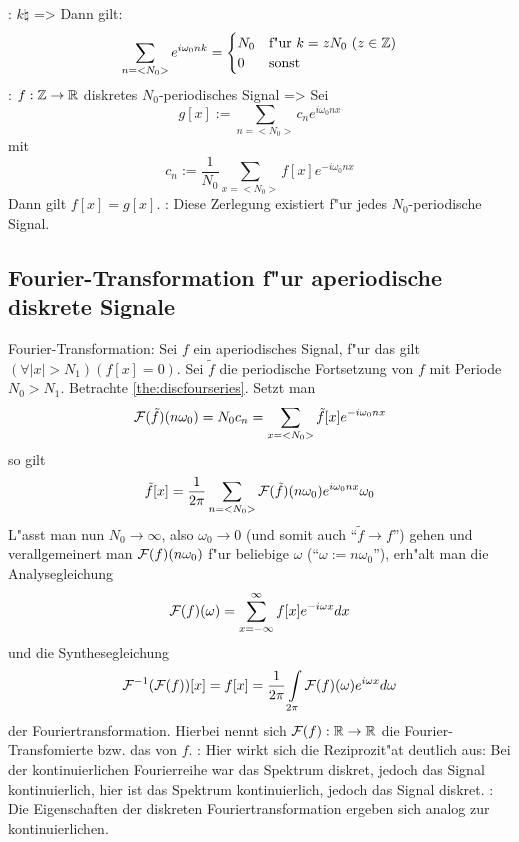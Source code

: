 \theorem:
  $k\natural$
  =>
{
  Dann gilt:
  \[
    \sum_{n=<N_0>} e^{i\omega_0 nk} =
    \begin{cases}
      N_0 & \text{f"ur $k=zN_0$ ($z\integer$)} \\
      0 & \text{sonst} 
    \end{cases}
  \]
}
\theorem:
  $f:\mathbb Z\to\mathbb R$ diskretes $N_0$-periodisches Signal 
  =>
{
  \label{the:discfourseries}
  Sei
  \[
    g[x]:=\sum_{n=<N_0>} c_n e^{i\omega_0 nx}
  \]
  mit
  \[
    c_n:=\frac 1 {N_0} \sum_{x=<N_0>} f[x] e^{-i\omega_0 nx}
  \]
  Dann gilt $f[x]=g[x]$.
}
\remark:{
  Diese Zerlegung existiert f"ur jedes $N_0$-periodische Signal.
}
\subsection{Fourier-Transformation f"ur aperiodische diskrete Signale}
 Fourier-Transformation:{
  Sei $f$ ein aperiodisches Signal, f"ur das gilt 
  $(\forall |x|>N_1)(f[x]=0)$. Sei $\tilde f$ die periodische Fortsetzung
  von $f$ mit Periode $N_0>N_1$.
  Betrachte \ref{the:discfourseries}. Setzt man
  \[
    \FT(\tilde f)(n\omega_0)=N_0 c_n=\sum_{x=<N_0>} \tilde f[x] e^{-i\omega_0 nx}
  \]
  so gilt
  \[
    \tilde f[x]=\frac 1 {2\pi} \sum_{n=<N_0>} \FT(\tilde f)(n\omega_0) e^{i\omega_0 nx} \omega_0
  \]
  L"asst man nun $N_0\to\infty$, also $\omega_0\to 0$ 
  (und somit auch ``$\tilde f\to f$'') gehen und 
  verallgemeinert man $\mathcal{F}(f)(n\omega_0)$ f"ur beliebige $\omega$ 
  (``$\omega:=n\omega_0$''), erh"alt man die Analysegleichung 
  \[
    \FT(f)(\omega)=\sum_{x=-\infty}^\infty f[x] e^{-i\omega x} dx 
  \]
  und die Synthesegleichung 
  \[
    \FT^{-1}(\FT(f))[x]=f[x]=
      \frac 1 {2\pi} \int_{2\pi} \FT(f)(\omega) e^{i\omega x} d\omega
  \]
  der Fouriertransformation. Hierbei nennt sich $\mathcal{F}(f):\mathbb R\to\mathbb R$ die 
  Fourier-Transfomierte bzw. das  von $f$.
}
\remark:{
  Hier wirkt sich die Reziprozit"at deutlich aus: Bei der 
  kontinuierlichen Fourierreihe war das Spektrum diskret, jedoch
  das Signal kontinuierlich, hier ist das Spektrum kontinuierlich,
  jedoch das Signal diskret.
}
\remark:{
  Die Eigenschaften der diskreten Fouriertransformation ergeben sich analog
  zur kontinuierlichen.
}

